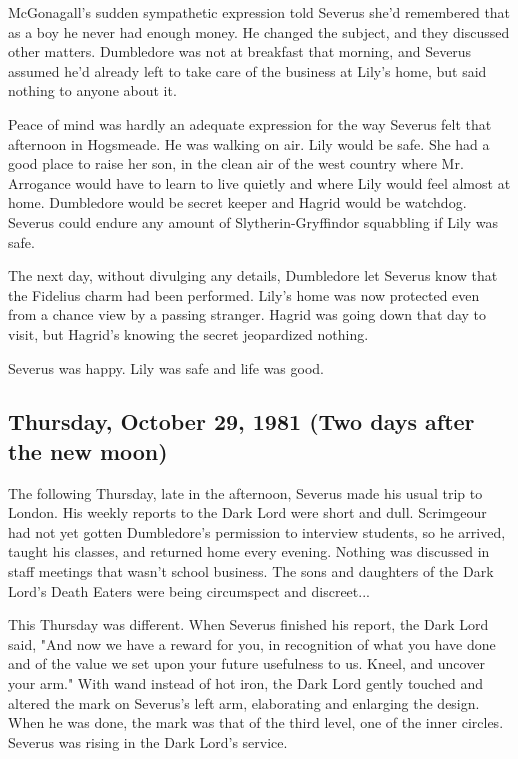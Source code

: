 McGonagall's sudden sympathetic expression told Severus she'd remembered that as a boy he never had enough money. He changed the subject, and they discussed other matters. Dumbledore was not at breakfast that morning, and Severus assumed he'd already left to take care of the business at Lily's home, but said nothing to anyone about it.

Peace of mind was hardly an adequate expression for the way Severus felt that afternoon in Hogsmeade. He was walking on air. Lily would be safe. She had a good place to raise her son, in the clean air of the west country where Mr. Arrogance would have to learn to live quietly and where Lily would feel almost at home. Dumbledore would be secret keeper and Hagrid would be watchdog. Severus could endure any amount of Slytherin-Gryffindor squabbling if Lily was safe.

The next day, without divulging any details, Dumbledore let Severus know that the Fidelius charm had been performed. Lily's home was now protected even from a chance view by a passing stranger. Hagrid was going down that day to visit, but Hagrid's knowing the secret jeopardized nothing.

Severus was happy. Lily was safe and life was good.

\subsection{Thursday, October 29, 1981 (Two days after the new moon)}

The following Thursday, late in the afternoon, Severus made his usual trip to London. His weekly reports to the Dark Lord were short and dull. Scrimgeour had not yet gotten Dumbledore's permission to interview students, so he arrived, taught his classes, and returned home every evening. Nothing was discussed in staff meetings that wasn't school business. The sons and daughters of the Dark Lord's Death Eaters were being circumspect and discreet...

This Thursday was different. When Severus finished his report, the Dark Lord said, "And now we have a reward for you, in recognition of what you have done and of the value we set upon your future usefulness to us. Kneel, and uncover your arm." With wand instead of hot iron, the Dark Lord gently touched and altered the mark on Severus's left arm, elaborating and enlarging the design. When he was done, the mark was that of the third level, one of the inner circles. Severus was rising in the Dark Lord's service.

